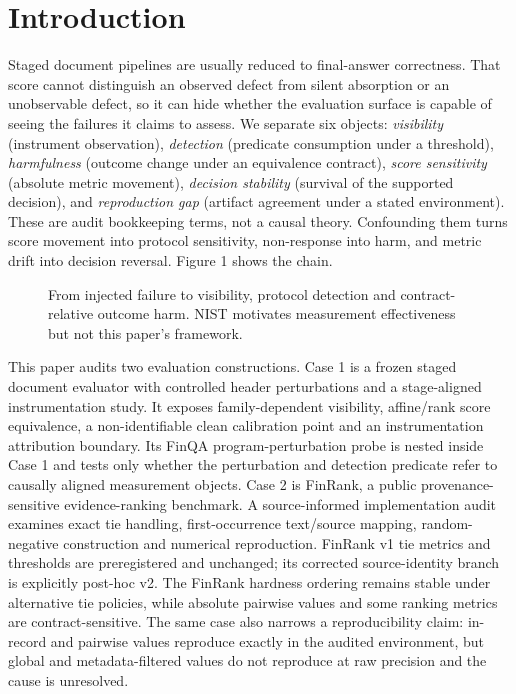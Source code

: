 \documentclass[10pt,conference]{IEEEtran}
\begin{document}
\section{Introduction}
Staged document pipelines are usually reduced to final-answer correctness. That score cannot distinguish an observed defect from silent absorption or an unobservable defect, so it can hide whether the evaluation surface is capable of seeing the failures it claims to assess.
We separate six objects: \emph{visibility} (instrument observation), \emph{detection} (predicate consumption under a threshold), \emph{harmfulness} (outcome change under an equivalence contract), \emph{score sensitivity} (absolute metric movement), \emph{decision stability} (survival of the supported decision), and \emph{reproduction gap} (artifact agreement under a stated environment). These are audit bookkeeping terms, not a causal theory. Confounding them turns score movement into protocol sensitivity, non-response into harm, and metric drift into decision reversal. Figure 1 shows the chain.
\begin{figure}[t]
\centering

\caption{From injected failure to visibility, protocol detection and contract-relative outcome harm. NIST motivates measurement effectiveness but not this paper's framework.}
\label{fig:1}
\end{figure}
This paper audits two evaluation constructions. Case 1 is a frozen staged document evaluator with controlled header perturbations and a stage-aligned instrumentation study. It exposes family-dependent visibility, affine/rank score equivalence, a non-identifiable clean calibration point and an instrumentation attribution boundary. Its FinQA program-perturbation probe is nested inside Case 1 and tests only whether the perturbation and detection predicate refer to causally aligned measurement objects. Case 2 is FinRank, a public provenance-sensitive evidence-ranking benchmark. A source-informed implementation audit examines exact tie handling, first-occurrence text/source mapping, random-negative construction and numerical reproduction. FinRank v1 tie metrics and thresholds are preregistered and unchanged; its corrected source-identity branch is explicitly post-hoc v2. The FinRank hardness ordering remains stable under alternative tie policies, while absolute pairwise values and some ranking metrics are contract-sensitive. The same case also narrows a reproducibility claim: in-record and pairwise values reproduce exactly in the audited environment, but global and metadata-filtered values do not reproduce at raw precision and the cause is unresolved.
\end{document}
